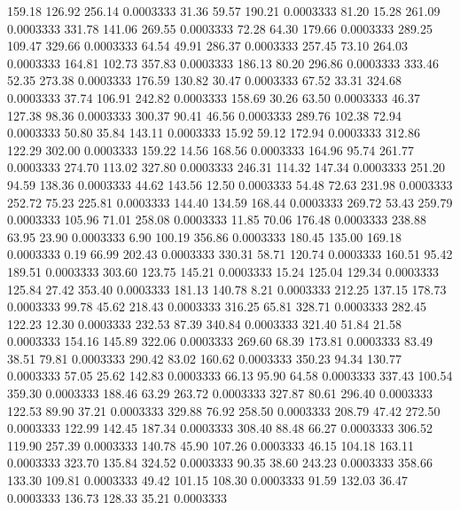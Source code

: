  159.18  126.92  256.14   0.0003333
  31.36   59.57  190.21   0.0003333
  81.20   15.28  261.09   0.0003333
 331.78  141.06  269.55   0.0003333
  72.28   64.30  179.66   0.0003333
 289.25  109.47  329.66   0.0003333
  64.54   49.91  286.37   0.0003333
 257.45   73.10  264.03   0.0003333
 164.81  102.73  357.83   0.0003333
 186.13   80.20  296.86   0.0003333
 333.46   52.35  273.38   0.0003333
 176.59  130.82   30.47   0.0003333
  67.52   33.31  324.68   0.0003333
  37.74  106.91  242.82   0.0003333
 158.69   30.26   63.50   0.0003333
  46.37  127.38   98.36   0.0003333
 300.37   90.41   46.56   0.0003333
 289.76  102.38   72.94   0.0003333
  50.80   35.84  143.11   0.0003333
  15.92   59.12  172.94   0.0003333
 312.86  122.29  302.00   0.0003333
 159.22   14.56  168.56   0.0003333
 164.96   95.74  261.77   0.0003333
 274.70  113.02  327.80   0.0003333
 246.31  114.32  147.34   0.0003333
 251.20   94.59  138.36   0.0003333
  44.62  143.56   12.50   0.0003333
  54.48   72.63  231.98   0.0003333
 252.72   75.23  225.81   0.0003333
 144.40  134.59  168.44   0.0003333
 269.72   53.43  259.79   0.0003333
 105.96   71.01  258.08   0.0003333
  11.85   70.06  176.48   0.0003333
 238.88   63.95   23.90   0.0003333
   6.90  100.19  356.86   0.0003333
 180.45  135.00  169.18   0.0003333
   0.19   66.99  202.43   0.0003333
 330.31   58.71  120.74   0.0003333
 160.51   95.42  189.51   0.0003333
 303.60  123.75  145.21   0.0003333
  15.24  125.04  129.34   0.0003333
 125.84   27.42  353.40   0.0003333
 181.13  140.78    8.21   0.0003333
 212.25  137.15  178.73   0.0003333
  99.78   45.62  218.43   0.0003333
 316.25   65.81  328.71   0.0003333
 282.45  122.23   12.30   0.0003333
 232.53   87.39  340.84   0.0003333
 321.40   51.84   21.58   0.0003333
 154.16  145.89  322.06   0.0003333
 269.60   68.39  173.81   0.0003333
  83.49   38.51   79.81   0.0003333
 290.42   83.02  160.62   0.0003333
 350.23   94.34  130.77   0.0003333
  57.05   25.62  142.83   0.0003333
  66.13   95.90   64.58   0.0003333
 337.43  100.54  359.30   0.0003333
 188.46   63.29  263.72   0.0003333
 327.87   80.61  296.40   0.0003333
 122.53   89.90   37.21   0.0003333
 329.88   76.92  258.50   0.0003333
 208.79   47.42  272.50   0.0003333
 122.99  142.45  187.34   0.0003333
 308.40   88.48   66.27   0.0003333
 306.52  119.90  257.39   0.0003333
 140.78   45.90  107.26   0.0003333
  46.15  104.18  163.11   0.0003333
 323.70  135.84  324.52   0.0003333
  90.35   38.60  243.23   0.0003333
 358.66  133.30  109.81   0.0003333
  49.42  101.15  108.30   0.0003333
  91.59  132.03   36.47   0.0003333
 136.73  128.33   35.21   0.0003333
